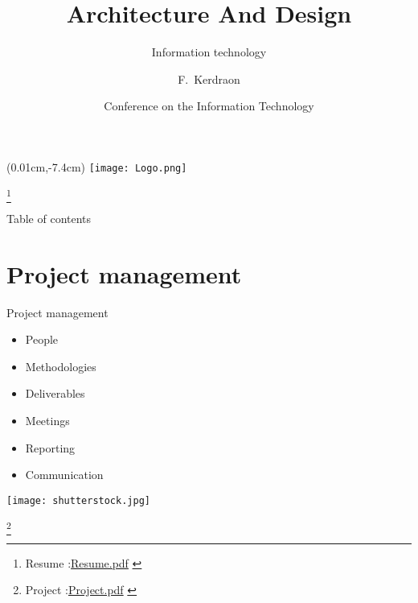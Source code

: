 \documentclass[8pt]{beamer}
\title[Personal introduction] %
{Architecture And Design}
\subtitle
{Information technology}
\author[Frederic Kerdraon] %
{F.~Kerdraon\inst{1}}%
\institute[University of theoretical physics] %
{
  \inst{1}%
  Department of Computer Science\\
  Global Business Analyst  
}
\date[CFP 2016] %
{Conference on the Information Technology}
\begin{document}
\begin{frame}
  \titlepage
\begin{textblock*}{0cm}(0.01cm,-7.4cm)
   \texttt{[image: Logo.png]}
\end{textblock*}
\footnote{
\tiny{Resume :\url{Resume.pdf} }
}
\end{frame}


\begin{frame}{Table of contents}
\begin{multicols}{2}
  \tableofcontents
\end{multicols}
\end{frame}





\section{Project management}

\begin{frame}{Project management}
\begin{multicols}{2}
[
]
 \begin{itemize}
  \item
   People 
  \item
   Methodologies 
  \item
   Deliverables 
  \item
   Meetings 
  \item
   Reporting 
  \item
   Communication 
 \end{itemize}
\texttt{[image: shutterstock.jpg]}
\end{multicols}
\footnote{
\tiny{Project :\url{Project.pdf} }
}

\end{frame}
\end{document}
